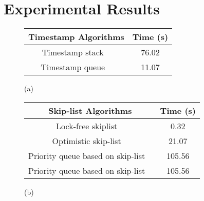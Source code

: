 \section{Experimental Results}
\label{section:experiments}
\newcommand{\emm}{(emm)}
\begin{figure}[]
\center



\begin{tabular}{|c | c | }
  \hline
   \textsf{\textbf{{Timestamp Algorithms}}} &  \textsf{\textbf{{Time (s)}}} \\
\hline
\hline
\textsf{Timestamp stack  ~\cite{MS:QueueAlgorithms}}\;\;\;\;\;\;  & \textsf{76.02} \\
\hline
\textsf{Timestamp queue  ~\cite{MS:QueueAlgorithms}}& \textsf{11.07} \\
\hline
\end{tabular}

\vspace*{0.1cm}

(a)
\\
\vspace*{0.5cm}

\begin{tabular}{|c | c | }
  \hline
   \textsf{\textbf{{Skip-list Algorithms}}} &  \textsf{\textbf{{Time (s)}}} \\
\hline
\hline
\;\;\;\;\textsf{Lock-free skiplist   ~\cite{ArtOfMpP}}\;\;\;\;\;\;  & \textsf{0.32} \\
\hline
\textsf{Optimistic skip-list  ~\cite{MS:QueueAlgorithms}}& \textsf{21.07} \\
\hline 
\textsf{Priority queue based on skip-list  ~\cite{Shavit:ElimQueue}}  &  \textsf{105.56} \\
\hline
\textsf{Priority queue based on skip-list  ~\cite{Shavit:ElimQueue}}  &  \textsf{105.56} \\
\hline
\end{tabular}

\vspace*{0.1cm}

(b)
\\
\vspace*{0.5cm}



\end{figure}
